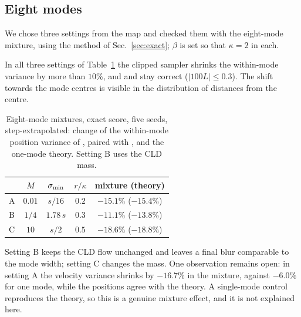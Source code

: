 \subsection{Eight modes}
We chose three settings from the map and checked them with the eight-mode mixture, using the method of Sec.~\ref{sec:exact}; $\beta$ is set so that $\kappa=2$ in each.

\begin{observation}[mixtures]
\label{obs:mixture}
In all three settings of Table~\ref{tab:mixture} the clipped sampler shrinks the within-mode variance by more than $10\%$, and \Sb{} and \Sc{} stay correct ($|100L|\leq0.3$).
The shift towards the mode centres is visible in the distribution of distances from the centre.
\end{observation}

\begin{table}[t]
\caption{Eight-mode mixtures, exact score, five seeds, step-extrapolated: change of the within-mode position variance of \Sa{}, paired with \Sb{}, and the one-mode theory. Setting B uses the CLD mass.}
\label{tab:mixture}
\begin{ruledtabular}
\begin{tabular}{lcccc}
 & $M$ & $\sigma_{\min}$ & $r/\kappa$ & mixture (theory) \\
\hline
A & $0.01$ & $s/16$ & $0.2$ & $-15.1\%$ ($-15.4\%$) \\
B & $1/4$ & $1.78\,s$ & $0.3$ & $-11.1\%$ ($-13.8\%$) \\
C & $10$ & $s/2$ & $0.5$ & $-18.6\%$ ($-18.8\%$) \\
\end{tabular}
\end{ruledtabular}
\end{table}

Setting B keeps the CLD flow unchanged and leaves a final blur comparable to the mode width; setting C changes the mass.
One observation remains open: in setting A the velocity variance shrinks by $-16.7\%$ in the mixture, against $-6.0\%$ for one mode, while the positions agree with the theory.
A single-mode control reproduces the theory, so this is a genuine mixture effect, and it is not explained here.
